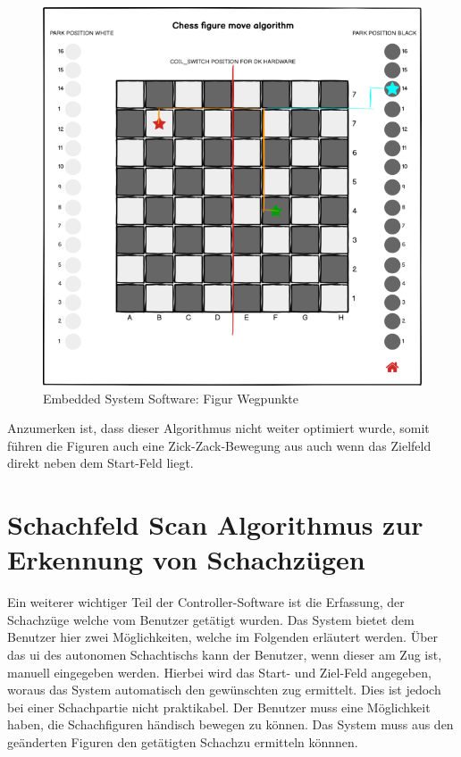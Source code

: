 \begin{figure}
\centering
\includegraphics{images/ATC_FigureMoveAlgorithm.png}
\caption{Embedded System Software: Figur Wegpunkte
\label{ATC_FigureMoveAlgorithm}}
\end{figure}

Anzumerken ist, dass dieser Algorithmus nicht weiter optimiert wurde,
somit führen die Figuren auch eine Zick-Zack-Bewegung aus auch wenn das
Zielfeld direkt neben dem Start-Feld liegt.

\hypertarget{schachfeld-scan-algorithmus-zur-erkennung-von-schachzuxfcgen}{%
\section{Schachfeld Scan Algorithmus zur Erkennung von
Schachzügen}\label{schachfeld-scan-algorithmus-zur-erkennung-von-schachzuxfcgen}}

Ein weiterer wichtiger Teil der Controller-Software ist die Erfassung,
der Schachzüge welche vom Benutzer getätigt wurden. Das System bietet
dem Benutzer hier zwei Möglichkeiten, welche im Folgenden erläutert
werden. Über das \gls{ui} des autonomen Schachtischs kann der Benutzer,
wenn dieser am Zug ist, manuell eingegeben werden. Hierbei wird das
Start- und Ziel-Feld angegeben, woraus das System automatisch den
gewünschten zug ermittelt. Dies ist jedoch bei einer Schachpartie nicht
praktikabel. Der Benutzer muss eine Möglichkeit haben, die Schachfiguren
händisch bewegen zu können. Das System muss aus den geänderten Figuren
den getätigten Schachzu ermitteln könnnen.

